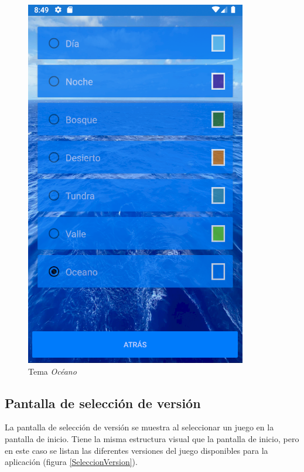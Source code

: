 \begin{figure}[H]
    \centering
    \includegraphics[scale=0.7]{Figures/Capturas/TemaOceano.png}
    \caption{Tema \textit{Océano}}
    \label{Oceano}    
\end{figure}

\subsection{Pantalla de selección de versión}
La pantalla de selección de versión se muestra al seleccionar un juego en la pantalla de inicio.
Tiene la misma estructura visual que la pantalla de inicio, pero en este caso se listan las diferentes versiones 
del juego disponibles para la aplicación (figura \ref*{SeleccionVersion}).


